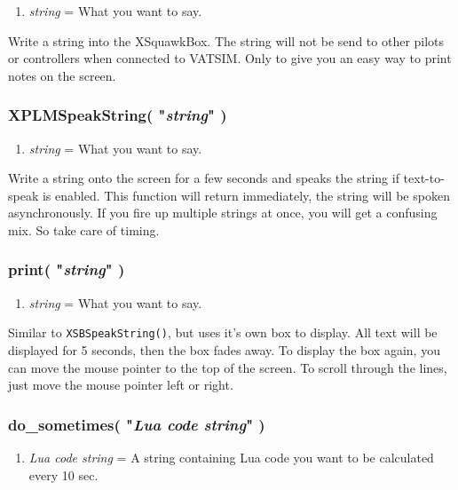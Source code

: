 \documentclass[11pt,parskip=half,a4paper]{scrartcl}
\begin{document}
\begin{enumerate}
	\item \emph{string} = What you want to say.
\end{enumerate}

Write a string into the XSquawkBox. The string will not be send to other pilots or controllers when connected to VATSIM. Only to give you an easy way to print notes on the screen.

\subsubsection{XPLMSpeakString( "\emph{string}" )}

\begin{enumerate}
	\item \emph{string} = What you want to say.
\end{enumerate}

Write a string onto the screen for a few seconds and speaks the string if text-to-speak is enabled. This function will return immediately, the string will be spoken asynchronously. If you fire up multiple strings at once, you will get a confusing mix. So take care of timing.

\newpage
\subsubsection{print( "\emph{string}" )}

\begin{enumerate}
	\item \emph{string} = What you want to say.
\end{enumerate}

Similar to \verb|XSBSpeakString()|, but uses it's own box to display. All text will be displayed for 5 seconds, then the box fades away. To display the box again, you can move the mouse pointer to the top of the screen. To scroll through the lines, just move the mouse pointer left or right.

\subsubsection{do\_sometimes( "\emph{Lua code string}" )}

\begin{enumerate}
	\item \emph{Lua code string} = A string containing Lua code you want to be calculated every 10 sec.
\end{enumerate}
\end{document}
